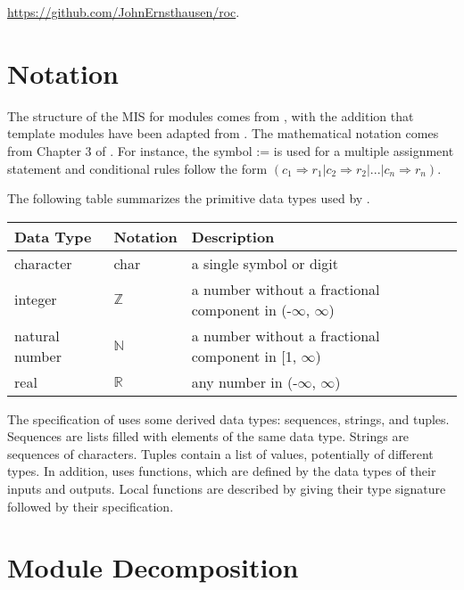 \documentclass[12pt, titlepage]{article}
\begin{document}
\noindent \url{https://github.com/JohnErnsthausen/roc}.

\section{Notation}


The structure of the MIS for modules comes from \citet{HoffmanAndStrooper1995},
with the addition that template modules have been adapted from
\cite{GhezziEtAl2003}.  The mathematical notation comes from Chapter 3 of
\citet{HoffmanAndStrooper1995}.  For instance, the symbol := is used for a
multiple assignment statement and conditional rules follow the form $(c_1
\Rightarrow r_1 | c_2 \Rightarrow r_2 | ... | c_n \Rightarrow r_n )$.

The following table summarizes the primitive data types used by . 

\begin{center}
\renewcommand{\arraystretch}{1.2}
\noindent 
\begin{tabular}{l l p{7.5cm}} 
\toprule 
\textbf{Data Type} & \textbf{Notation} & \textbf{Description}\\ 
\midrule
character & char & a single symbol or digit\\
integer & $\mathbb{Z}$ & a number without a fractional component in (-$\infty$, $\infty$) \\
natural number & $\mathbb{N}$ & a number without a fractional component in [1, $\infty$) \\
real & $\mathbb{R}$ & any number in (-$\infty$, $\infty$)\\
\bottomrule
\end{tabular} 
\end{center}

\noindent
The specification of  uses some derived data types: sequences, strings, and
tuples. Sequences are lists filled with elements of the same data type. Strings
are sequences of characters. Tuples contain a list of values, potentially of
different types. In addition,  uses functions, which
are defined by the data types of their inputs and outputs. Local functions are
described by giving their type signature followed by their specification.

\section{Module Decomposition}
\end{document}
